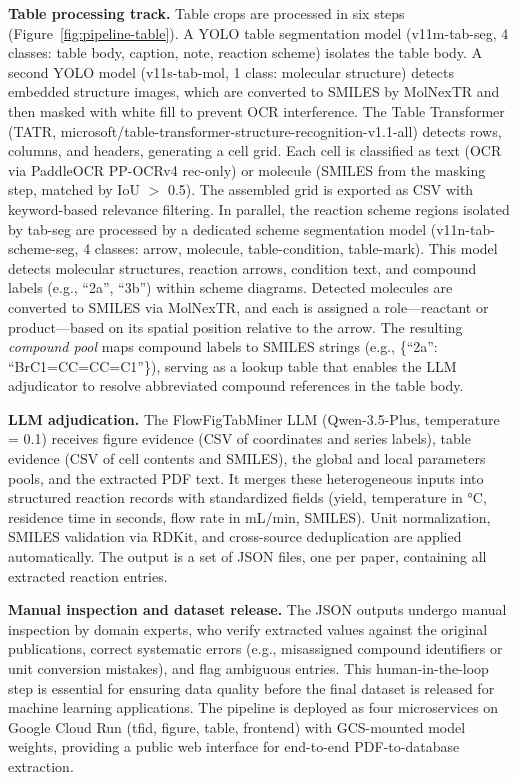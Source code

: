 \documentclass[journal=jcisd8,manuscript=article]{achemso}
\begin{document}
\textbf{Table processing track.}
Table crops are processed in six steps (Figure~\ref{fig:pipeline-table}).
A YOLO table segmentation model (v11m-tab-seg, 4 classes: table body, caption, note, reaction scheme) isolates the table body.
A second YOLO model (v11s-tab-mol, 1 class: molecular structure) detects embedded structure images, which are converted to SMILES by MolNexTR and then masked with white fill to prevent OCR interference.
The Table Transformer (TATR, microsoft/table-transformer-structure-recognition-v1.1-all) detects rows, columns, and headers, generating a cell grid.
Each cell is classified as text (OCR via PaddleOCR PP-OCRv4 rec-only) or molecule (SMILES from the masking step, matched by IoU $>$ 0.5).
The assembled grid is exported as CSV with keyword-based relevance filtering.
In parallel, the reaction scheme regions isolated by tab-seg are processed by a dedicated scheme segmentation model (v11n-tab-scheme-seg, 4 classes: arrow, molecule, table-condition, table-mark).
This model detects molecular structures, reaction arrows, condition text, and compound labels (e.g., ``2a'', ``3b'') within scheme diagrams.
Detected molecules are converted to SMILES via MolNexTR, and each is assigned a role---reactant or product---based on its spatial position relative to the arrow.
The resulting \textit{compound pool} maps compound labels to SMILES strings (e.g., \{``2a'': ``BrC1=CC=CC=C1''\}), serving as a lookup table that enables the LLM adjudicator to resolve abbreviated compound references in the table body.

\textbf{LLM adjudication.}
The FlowFigTabMiner LLM (Qwen-3.5-Plus, temperature = 0.1) receives figure evidence (CSV of coordinates and series labels), table evidence (CSV of cell contents and SMILES), the global and local parameters pools, and the extracted PDF text.
It merges these heterogeneous inputs into structured reaction records with standardized fields (yield, temperature in \si{\celsius}, residence time in seconds, flow rate in mL/min, SMILES).
Unit normalization, SMILES validation via RDKit, and cross-source deduplication are applied automatically.
The output is a set of JSON files, one per paper, containing all extracted reaction entries.

\textbf{Manual inspection and dataset release.}
The JSON outputs undergo manual inspection by domain experts, who verify extracted values against the original publications, correct systematic errors (e.g., misassigned compound identifiers or unit conversion mistakes), and flag ambiguous entries.
This human-in-the-loop step is essential for ensuring data quality before the final dataset is released for machine learning applications.
The pipeline is deployed as four microservices on Google Cloud Run (tfid, figure, table, frontend) with GCS-mounted model weights, providing a public web interface for end-to-end PDF-to-database extraction.
\end{document}
